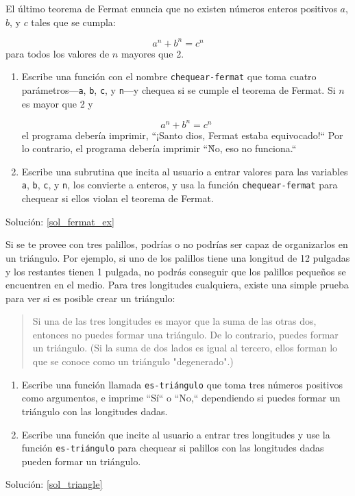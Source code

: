 \begin{exercise}
\label{fermat_ex}

El último teorema de Fermat enuncia que no existen números enteros
positivos $a$, $b$, y $c$ tales que se cumpla:

\[ a^n + b^n = c^n \]
%
para todos los valores de $n$ mayores que 2.

\begin{enumerate}

\item Escribe una función con el nombre \verb|chequear-fermat| que
toma cuatro parámetros---{\tt a}, {\tt b}, {\tt c}, y {\tt n}---y
chequea si se cumple el teorema de Fermat. Si $n$ es mayor que 2 y 

\[a^n + b^n = c^n \]
%
el programa debería imprimir, ``¡Santo dios, Fermat estaba equivocado!``
Por lo contrario, el programa debería imprimir ``Ǹo, eso no funciona.``

\item Escribe una subrutina que incita al usuario a entrar valores para 
las variables {\tt a}, {\tt b}, {\tt c}, y {\tt n}, los convierte a enteros,
y usa la función \verb|chequear-fermat| para chequear si ellos violan
el teorema de Fermat.
\end{enumerate}

Solución: \ref{sol_fermat_ex}


\end{exercise}


\begin{exercise}
\label{triangle}

Si se te provee con tres palillos, podrías o no podrías 
ser capaz de organizarlos en un triángulo.
Por ejemplo, si uno de los palillos tiene una longitud de 
12 pulgadas y los restantes tienen 1 pulgada, no podrás
conseguir que los palillos pequeños se encuentren en 
el medio. Para tres longitudes cualquiera, existe una 
simple prueba para ver si es posible crear un triángulo:

\begin{quotation}
Si una de las tres longitudes es mayor que la suma de las
otras dos, entonces no puedes formar una triángulo. De lo
contrario, puedes formar un triángulo. (Si la suma de dos
lados es igual al tercero, ellos forman lo que se
conoce como un triángulo "degenerado".)
\end{quotation}

\begin{enumerate}

\item Escribe una función llamada \verb|es-triángulo| que toma
tres números positivos como argumentos, e imprime ``Sí`` o ``No,``
dependiendo si puedes formar un triángulo con las longitudes
dadas.

\item Escribe una función que incite al usuario a entrar
tres longitudes y use la función \verb|es-triángulo| para 
chequear si palillos con las longitudes dadas pueden formar 
un triángulo.
\end{enumerate}

Solución: \ref{sol_triangle}


\end{exercise}


